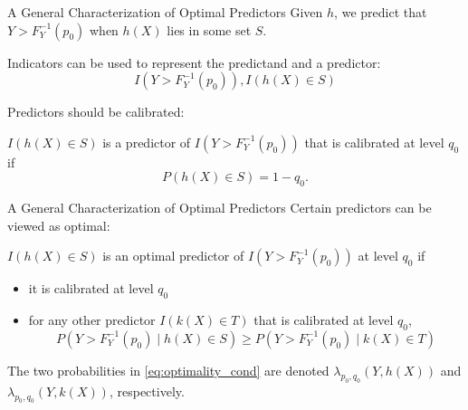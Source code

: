 \documentclass{beamer}
\begin{document}
\begin{frame}{A General Characterization of Optimal Predictors}
    Given $h$, we predict that $Y > F_Y^{-1}(p_0)$ when $h(X)$ lies in some set $S$.

    Indicators can be used to represent the predictand and a predictor:
    \[
    I(Y > F_Y^{-1}(p_0)), I(h(X) \in S)
    \]

    Predictors should be calibrated:
    \begin{definition}
        $I(h(X) \in S)$ is a predictor of $I(Y > F_Y^{-1}(p_0))$ that is calibrated at level $q_0$ if 
        \[
        P(h(X) \in S) = 1 - q_0.
        \]
    \end{definition}
\end{frame}

\begin{frame}{A General Characterization of Optimal Predictors}
    Certain predictors can be viewed as optimal: 
    \begin{definition}\label{d:opt-pred}
        $I(h(X) \in S)$ is an optimal predictor of $I(Y > F_Y^{-1}(p_0))$ at level $q_0$ if
        \begin{itemize}
            \item it is calibrated at level $q_0$
            \item for any other predictor $I(k(X) \in T)$ that is calibrated at level $q_0$,
            \begin{equation}\label{eq:optimality_cond}
            P(Y > F_Y^{-1}(p_0) \mid h(X) \in S) \ge P(Y > F_Y^{-1}(p_0) \mid k(X) \in T)
            \end{equation}
        \end{itemize}
        The two probabilities in \eqref{eq:optimality_cond} are denoted $\lambda_{p_0, q_0}(Y, h(X))$ and $\lambda_{p_0, q_0}(Y, k(X))$, respectively.
    \end{definition}
\end{frame}
\end{document}
